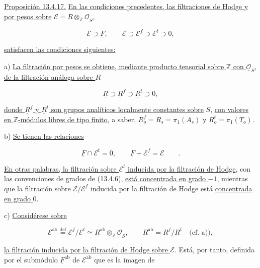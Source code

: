\medskip
\noindent
\underline{Proposición 13.4.17.} \underline{En las condiciones
precedentes, las filtraciones de Hodge y por pesos sobre}
$\mathcal E=\underline R\otimes_{\mathbb Z}\underline{\mathcal O}_S$,

\begin{equation}\tag{13.4.17.1}
 \mathcal E\supset\underline F,
 \qquad
 \mathcal E\supset\mathcal E^f\supset\mathcal E^t\supset0,
\end{equation}

\noindent
\underline{satisfacen las condiciones siguientes:}

\smallskip
\noindent
a) \underline{La filtración por pesos se obtiene, mediante producto
tensorial sobre $\mathbb Z$ con $\underline{\mathcal O}_S$, de la
filtración análoga sobre $\underline R$}

\begin{equation*}
 \underline R\supset\underline R^f\supset\underline R^t\supset0,
\end{equation*}

\noindent
\underline{donde $\underline R^f$ y $\underline R^t$ son grupos
analíticos localmente constantes sobre} $S$, \underline{con valores en
$\mathbb Z$-módulos libres de tipo finito}, a saber,
$R_o^f=R_s=\pi_1(A_s)$ y $R_o^t=\pi_1(T_o)$.

\smallskip
\noindent
b) \underline{Se tienen las relaciones}

\begin{equation}\tag{*}
 \underline F\cap\mathcal E^t=0,
 \qquad \underline F+\mathcal E^f=\mathcal E\qquad .
\end{equation}

\noindent
\underline{En otras palabras, la filtración sobre $\mathcal E^t$
inducida por la filtración de Hodge}, con las convenciones de grados de
(13.4.6), \underline{está concentrada en grado $-1$}, mientras que la
filtración sobre $\mathcal E/\mathcal E^f$ inducida por la filtración de
Hodge está \underline{concentrada en grado $0$}.

\smallskip
\noindent
c) \underline{Considérese sobre}

\begin{equation*}
 \mathcal E^{\mathrm{ab}}
 \stackrel{\mathrm{def}}{=}\mathcal E^f/\mathcal E^t
 \simeq\underline R^{\mathrm{ab}}\otimes_{\mathbb Z}
 \underline{\mathcal O}_S,
 \qquad
 \underline R^{\mathrm{ab}}=\underline R^f/\underline R^t
 \quad\text{(cf. a))},
\end{equation*}

\noindent
\underline{la filtración inducida por la filtración de Hodge sobre
$\mathcal E$}. Está, por tanto, definida por el submódulo
$\underline F^{\mathrm{ab}}$ de $\mathcal E^{\mathrm{ab}}$ que es la
imagen de

